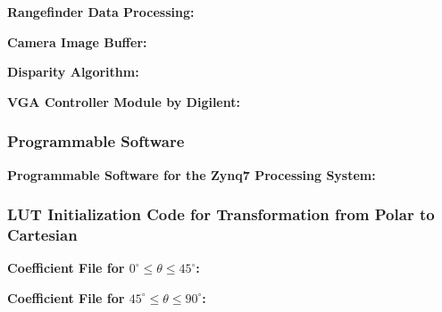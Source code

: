 \par
\textbf{Rangefinder Data Processing:} \label{rangefinderDP}
\singlespacing

\doublespacing

\par
\textbf{Camera Image Buffer:} \label{finalCamBuf}
\singlespacing

\doublespacing

\par
\textbf{Disparity Algorithm:} \label{finalDisparity}
\singlespacing

\doublespacing

\par
\textbf{VGA Controller Module by Digilent:} \label{vga_controller}
\singlespacing

\doublespacing

\newpage

\subsubsection{Programmable Software} \label{ps_code}
\textbf{Programmable Software for the Zynq7 Processing System:}
\singlespacing

\doublespacing

\newpage

\subsubsection{LUT Initialization Code for Transformation from Polar to Cartesian} \label{coe_file}
\textbf{Coefficient File for $0^\circ{}\leq{}\theta{}\leq45^\circ$:}
\singlespacing

\doublespacing
\par
\textbf{Coefficient File for $45^\circ{}\leq{}\theta{}\leq90^\circ$:}
\singlespacing

\doublespacing






